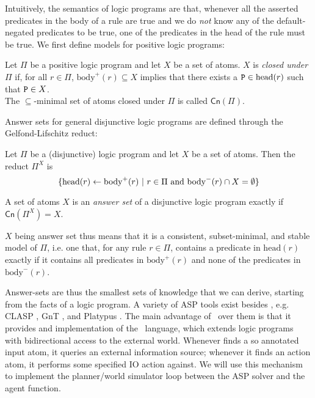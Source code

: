 Intuitively, the semantics of logic programs are that, whenever all the asserted predicates in the body of a rule are true and we do {\em not} know any of the default-negated predicates to be true, one of the predicates in the head of the rule must be true. We first define models for positive logic programs:

\begin{definition}
	Let $\Pi$ be a positive logic program and let $X$ be a set of atoms. $X$ is {\em closed under} $\Pi$ if, for all $r \in \Pi$, $\mathrm{body}^+(r) \subseteq X$ implies that there exists a $\mathtt{P} \in \mathrm{head}(r)$ such that $\mathtt{P} \in X$.\\
	
	\noindent
	The $\subseteq$-minimal set of atoms closed under $\Pi$ is called $\mathsf{Cn}(\Pi)$.
\end{definition}

Answer sets for general disjunctive logic programs are defined through the Gelfond-Lifschitz reduct:

\begin{definition}
Let $\Pi$ be a (disjunctive) logic program and let $X$ be a set of atoms. Then the reduct $\Pi^X$ is
	$$
		\{ \mathrm{head}(r) \leftarrow \mathrm{body}^+(r)\ |\ r \in \Pi \textnormal{ and } \mathrm{body}^-(r) \cap X = \emptyset \}
	$$
\end{definition}

\begin{definition}
	A set of atoms $X$ is an {\em answer set} of a disjunctive logic program exactly if $\mathsf{Cn}(\Pi^X) = X$.
\end{definition}

$X$ being answer set thus means that it is a consistent, subset-minimal, and stable model of $\Pi$, i.e. one that, for any rule $r \in \Pi$, contains a predicate in $\mathrm{head}(r)$ exactly if it contains all predicates in $\mathrm{body}^+(r)$ and none of the predicates in $\mathrm{body}^-(r)$.

Answer-sets are thus the smallest sets of knowledge that we can derive, starting from the facts of a logic program. A variety of ASP tools exist besides \dlvhex, e.g. CLASP \cite{clasp}, GnT \cite{gnt}, and Platypus \cite{platypus}. The main advantage of \dlvhex\ over them is that it provides and implementation of the \acthex\ language\cite{acthex}, which extends logic programs with bidirectional access to the external world. Whenever \dlvhex finds a so annotated input atom, it queries an external information source; whenever it finds an action atom, it performs some specified IO action against. We will use this mechanism to implement the planner/world simulator loop between the ASP solver and the agent function.

